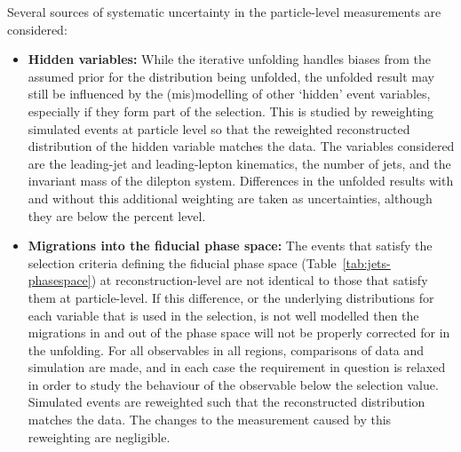 \documentclass[atlasdraft=false, cernpreprint, UKenglish, texmf, orcidlogo]{atlasdoc}
\begin{document}
Several sources of systematic uncertainty in the particle-level measurements are considered:
\begin{itemize}
\item \textbf{Hidden variables:} While the iterative unfolding handles biases from the assumed prior for the distribution being unfolded, the unfolded result may still
be influenced by the (mis)modelling of other `hidden' event variables, especially if they form part of the selection.
This is studied by reweighting simulated events at particle level so that
the reweighted reconstructed distribution of the hidden variable matches the data.
The variables considered are the leading-jet and leading-lepton kinematics, the number of jets, and the invariant mass of the dilepton system.
Differences in the unfolded results with and without this additional weighting are taken as uncertainties, although they are below the percent level.
 
\item \textbf{Migrations into the fiducial phase space:} The events that satisfy the selection criteria defining the fiducial phase space (Table~\ref{tab:jets-phasespace}) at
reconstruction-level are not identical to those that satisfy them at particle-level. If this difference, or the
underlying distributions for each variable that is used in the selection, is not well modelled then the migrations in and
out of the phase space will not be properly corrected for in the unfolding.
For all observables in all regions, comparisons of data and simulation
are made, and in each case the requirement in question is relaxed in order to study the behaviour of the observable below the selection value.
Simulated events are reweighted such that the reconstructed distribution matches the data. The changes to the
measurement caused by this reweighting are negligible.
 

\end{itemize}
\end{document}
